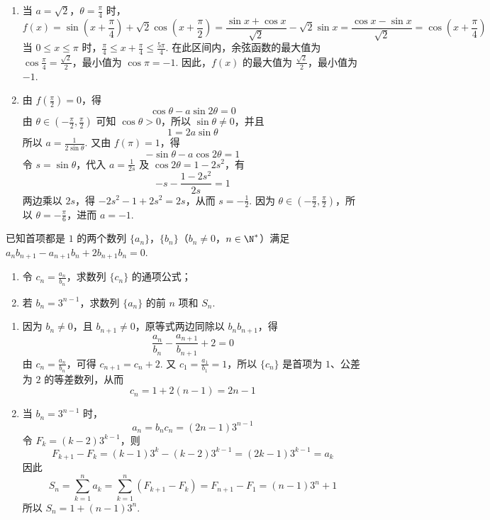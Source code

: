 \begin{solution}
\begin{enumerate}
\item 当 \(a=\sqrt{2}\)，\(\theta=\frac{\pi}{4}\) 时，
\[
f(x)=\sin\left(x+\frac{\pi}{4}\right)+\sqrt{2}\cos\left(x+\frac{\pi}{2}\right)
=\frac{\sin x+\cos x}{\sqrt{2}}-\sqrt{2}\sin x
=\frac{\cos x-\sin x}{\sqrt{2}}
=\cos\left(x+\frac{\pi}{4}\right)
\]
当 \(0\leqslant x\leqslant\pi\) 时，\(\frac{\pi}{4}\leqslant x+\frac{\pi}{4}\leqslant\frac{5\pi}{4}\). 在此区间内，余弦函数的最大值为 \(\cos\frac{\pi}{4}=\frac{\sqrt{2}}{2}\)，最小值为 \(\cos\pi=-1\). 因此，\(f(x)\) 的最大值为 \(\frac{\sqrt{2}}{2}\)，最小值为 \(-1\).

\item 由 \(f\left(\frac{\pi}{2}\right)=0\)，得
\[
\cos\theta-a\sin 2\theta=0
\]
由 \(\theta\in\left(-\frac{\pi}{2},\frac{\pi}{2}\right)\) 可知 \(\cos\theta>0\)，所以 \(\sin\theta\neq 0\)，并且
\[
1=2a\sin\theta
\]
所以 \(a=\frac{1}{2\sin\theta}\). 又由 \(f(\pi)=1\)，得
\[
-\sin\theta-a\cos 2\theta=1
\]
令 \(s=\sin\theta\)，代入 \(a=\frac{1}{2s}\) 及 \(\cos 2\theta=1-2s^2\)，有
\[
-s-\frac{1-2s^2}{2s}=1
\]
两边乘以 \(2s\)，得 \(-2s^2-1+2s^2=2s\)，从而 \(s=-\frac{1}{2}\). 因为 \(\theta\in\left(-\frac{\pi}{2},\frac{\pi}{2}\right)\)，所以 \(\theta=-\frac{\pi}{6}\)，进而 \(a=-1\).
\end{enumerate}
\end{solution}

\begin{problem}
已知首项都是 \(1\) 的两个数列 \(\{a_{n}\}\)，\(\{b_{n}\}\)（\(b_{n} \neq 0\)，\(n \in \N^{*}\)）满足 \(a_{n}b_{n+1} - a_{n+1}b_{n} + 2b_{n+1}b_{n} = 0\).

\begin{enumerate}
\item 令 \(c_{n} = \frac{a_{n}}{b_{n}}\)，求数列 \(\{c_{n}\}\) 的通项公式；
\item 若 \(b_{n} = 3^{n - 1}\)，求数列 \(\{a_{n}\}\) 的前 \(n\) 项和 \(S_{n}\).
\end{enumerate}
\end{problem}

\begin{solution}
\begin{enumerate}
\item 因为 \(b_n\neq 0\)，且 \(b_{n+1}\neq 0\)，原等式两边同除以 \(b_nb_{n+1}\)，得
\[
\frac{a_n}{b_n}-\frac{a_{n+1}}{b_{n+1}}+2=0
\]
由 \(c_n=\frac{a_n}{b_n}\)，可得 \(c_{n+1}=c_n+2\). 又 \(c_1=\frac{a_1}{b_1}=1\)，所以 \(\{c_n\}\) 是首项为 \(1\)、公差为 \(2\) 的等差数列，从而
\[
c_n=1+2(n-1)=2n-1
\]

\item 当 \(b_n=3^{n-1}\) 时，
\[
a_n=b_nc_n=(2n-1)3^{n-1}
\]
令 \(F_k=(k-2)3^{k-1}\)，则
\[
F_{k+1}-F_k=(k-1)3^k-(k-2)3^{k-1}=(2k-1)3^{k-1}=a_k
\]
因此
\[
S_n=\sum_{k=1}^{n}a_k=\sum_{k=1}^{n}(F_{k+1}-F_k)=F_{n+1}-F_1=(n-1)3^n+1
\]
所以 \(S_n=1+(n-1)3^n\).
\end{enumerate}
\end{solution}

